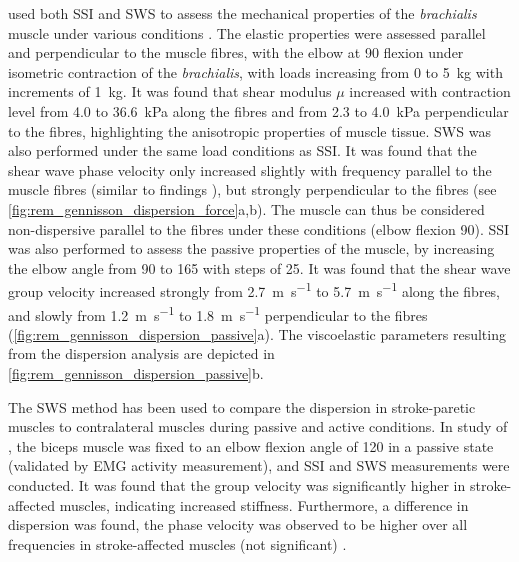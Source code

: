 \citeauthor{gennisson_viscoelastic_2010} used both SSI and SWS to assess the mechanical properties of the \textit{brachialis} muscle under various conditions \cite{gennisson_viscoelastic_2010}. The elastic properties were assessed parallel and perpendicular to the muscle fibres, with the elbow at \SI{90}{\deg} flexion under isometric contraction of the \textit{brachialis}, with loads increasing from 0 to \SI{5}{\kilogram} with increments of \SI{1}{\kilogram}. It was found that shear modulus $\mu$ increased with contraction level from 4.0 to \SI{36.6}{\kilo\pascal} along the fibres and from 2.3 to \SI{4.0}{\kilo\pascal} perpendicular to the fibres, highlighting the anisotropic properties of muscle tissue. SWS was also performed under the same load conditions as SSI. It was found that the shear wave phase velocity only increased slightly with frequency parallel to the muscle fibres (similar to findings \citet{deffieux_shear_2009}), but strongly perpendicular to the fibres (see \autoref{fig:rem_gennisson_dispersion_force}a,b). The muscle can thus be considered non-dispersive parallel to the fibres under these conditions (elbow flexion \SI{90}{\deg}). SSI was also performed to assess the passive properties of the muscle, by increasing the elbow angle from 90 to \SI{165}{\deg} with steps of \SI{25}{\deg}. It was found that the shear wave group velocity increased strongly from \SI{2.7}{\meter\per\second} to \SI{5.7}{\meter\per\second} along the fibres, and slowly from \SI{1.2}{\meter\per\second} to \SI{1.8}{\meter\per\second} perpendicular to the fibres (\autoref{fig:rem_gennisson_dispersion_passive}a). The viscoelastic parameters resulting from the dispersion analysis are depicted in \autoref{fig:rem_gennisson_dispersion_passive}b. %


The SWS method has been used to compare the dispersion in stroke-paretic muscles to contralateral muscles during passive \cite{rasool_altered_2016} and active \cite{saadat_frequency_2018} conditions. In study of \citet{rasool_altered_2016}, the biceps muscle was fixed to an elbow flexion angle of \SI{120}{\deg} in a passive state (validated by EMG activity measurement), and SSI and SWS measurements were conducted. It was found that the group velocity was significantly higher in stroke-affected muscles, indicating increased stiffness. Furthermore, a difference in dispersion was found, the phase velocity was observed to be higher over all frequencies in stroke-affected muscles (not significant) \cite{rasool_altered_2016}. 

